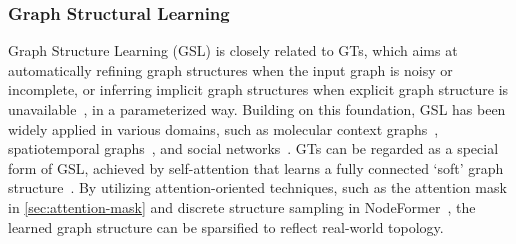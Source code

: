 \subsubsection{Graph Structural Learning}
Graph Structure Learning (GSL) is closely related to GTs, which aims at automatically 
refining graph structures when the input graph is noisy or incomplete, or inferring implicit graph structures when explicit graph structure is unavailable~\cite{GSLB}, in a parameterized way.
Building on this foundation, GSL has been widely applied in various domains, such as molecular context graphs~\cite{PAR,Pin-Tuning}, spatiotemporal graphs~\cite{BiGSL}, and social networks~\cite{VIB-GSL}.
GTs can be regarded as a special form of GSL, achieved by self-attention that learns a fully connected `soft' graph structure~\cite{mp-all-the-way-up}. 
By utilizing attention-oriented techniques, such as the attention mask in \cref{sec:attention-mask} and discrete structure sampling in NodeFormer~\cite{wu2022nodeformer}, the learned graph structure can be sparsified to reflect real-world topology.




